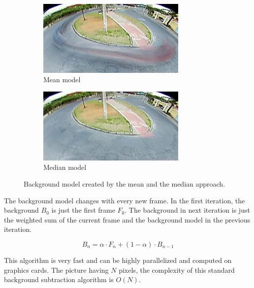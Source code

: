 \documentclass[a4paper,12pt,titlepage]{article}
\numberwithin{figure}{section}
\begin{document}
\begin{figure}
    \begin{subfigure}[Sample1]{0.5\linewidth}
        \includegraphics[height=37mm]{fig/background_mean_crop.png}
        \caption{Mean model}
        \label{fig:cut_mean}
    \end{subfigure}
    \qquad
    \begin{subfigure}[Sample1]{0.5\linewidth}    
        \includegraphics[height=37mm]{fig/background_med_crop.png}  
        \caption{Median model}
        \label{fig:cut_med}  
    \end{subfigure} 
    \caption{Background model created by the mean and the median approach.}
\end{figure}

The background model changes with every new frame. In the first iteration, the background $B_0$ is just the first frame $F_0$. The background in next iteration is just the weighted sum of the  current frame and the background model in the previous iteration.

\begin{equation}
B_n = \alpha \cdot F_n + (1 - \alpha) \cdot B_{n-1}
\end{equation}

This algorithm is very fast and can be highly parallelized and computed on graphics cards. The picture having $N$  pixels, the complexity of this standard background subtraction algorithm is  $O(N)$.
\end{document}
